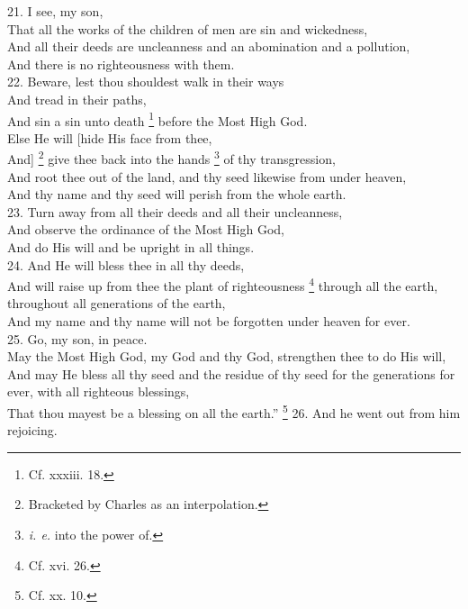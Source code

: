 21. I see, my son,\\
That all the works of the children of men are sin and wickedness,\\
And all their deeds are uncleanness and an abomination and a pollution,\\
And there is no righteousness with them.\\
22. Beware, lest thou shouldest walk in their ways\\
And tread in their paths,\\
And sin a sin unto death \footnote{Cf. xxxiii. 18.} before the Most High God.\\
Else He will [hide His face from thee,\\
And] \footnote{Bracketed by Charles as an interpolation.} give thee back into the hands \footnote{\emph{i. e.} into the power of.} of thy transgression,\\
And root thee out of the land, and thy seed likewise from under heaven,\\
And thy name and thy seed will perish from the whole earth.\\
23. Turn away from all their deeds and all their uncleanness,\\
And observe the ordinance of the Most High God,\\
And do His will and be upright in all things.\\
24. And He will bless thee in all thy deeds,\\
And will raise up from thee the plant of righteousness \footnote{Cf. xvi. 26.} through all the earth, throughout all generations of the earth,\\
And my name and thy name will not be forgotten under heaven for ever. \\
25. Go, my son, in peace.\\
May the Most High God, my God and thy God, strengthen thee to do His will,\\
And may He bless all thy seed and the residue of thy seed for the generations for ever, with all righteous blessings,\\
That thou mayest be a blessing on all the earth.'' \footnote{Cf. xx. 10.} 26. And he went out from him rejoicing.


